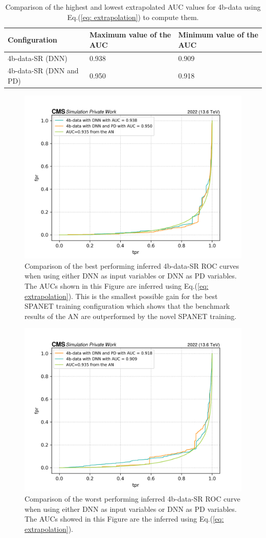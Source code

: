 \begin{table}[hbt]
\centering
\begin{tabular}{|M{5cm}||M{2.5cm}|M{2.5cm}|}
 \hline
 Configuration  & Maximum value of the AUC & Minimum value of the AUC \\
 \hline
 4b-data-SR (DNN) & 0.938 & 0.909  \\
 \hline
 4b-data-SR (DNN and PD) & 0.950 & 0.918 \\
 \hline
\end{tabular}
\caption{Comparison of the highest and lowest extrapolated AUC values for 4b-data using Eq.(\ref{eq: extrapolation}) to compute them.}
\label{table: highest/ lowest SR 4b data}
\end{table}

\begin{figure}[hbt]
    \centering
    \includegraphics[width=0.7\linewidth]{Images/7.S:B/SR stats/HIghest AUC ROC vs Highest AUC vs AN.png}
    \caption{Comparison of the best performing inferred 4b-data-SR ROC curves when using either DNN as input variables or DNN as PD variables. The AUCs shown in this Figure are inferred using Eq.(\ref{eq: extrapolation}). This is the smallest possible gain for the best SPANET training configuration which shows that the benchmark results of the AN are outperformed by the novel SPANET training.}
    \label{fig: highest comp}
\end{figure}

\begin{figure}[hbt]
    \centering
    \includegraphics[width=0.7\linewidth]{Images/7.S:B/SR stats/lowest comp 4b data.png}
    \caption{Comparison of the worst performing inferred 4b-data-SR ROC curve when using either DNN as input variables or DNN as PD variables. The AUCs showed in this Figure are the inferred using Eq.(\ref{eq: extrapolation}).}
    \label{fig: lowest comp}
\end{figure}
